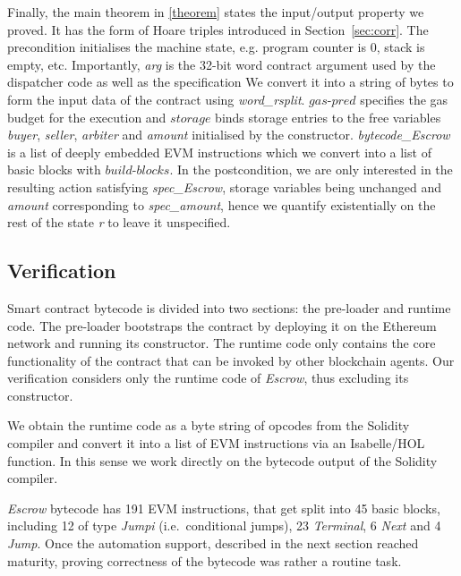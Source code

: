 \documentclass[sigplan,10pt]{acmart}\settopmatter{printfolios=true,printccs=false,printacmref=false}
\newcommand{\gaspred}{\mathit{gas\mbox{-}pred}}
\newcommand{\storage}{\mathit{storage}}
\newcommand{\bblocks}{\mathit{build\mbox{-}blocks}}
\begin{document}
Finally, the main theorem in \autoref{theorem} states the input/output 
property we proved.
It has the form of Hoare triples introduced in Section~\ref{sec:corr}.
The precondition initialises the machine state, e.g. program counter is $0$,
stack is empty, etc.
Importantly, \textit{arg} is the 32-bit word contract
argument used by the dispatcher code as well as the specification
We convert it into a string of bytes to form the input data of the contract
using \textit{word\_rsplit}.
$\gaspred$ specifies the gas budget for the execution and $\storage$
binds storage entries to the free variables \textit{buyer}, \textit{seller},
\textit{arbiter} and \textit{amount} initialised by the constructor.
\textit{bytecode\_Escrow} is a list of deeply embedded EVM
instructions which we convert into a list of basic blocks with $\bblocks$.
In the postcondition, we are only interested in the resulting action
satisfying \textit{spec\_Escrow}, storage variables being unchanged
and \textit{amount} corresponding to \textit{spec\_amount},
hence we quantify existentially on the rest of the state \textit{r}
to leave it unspecified.

\subsection{Verification}

\label{sec:verif}

Smart contract bytecode is divided into two sections: the pre-loader and
runtime code.
The pre-loader bootstraps the contract by deploying it on the
Ethereum network and running its constructor.
The runtime code only contains the core functionality of the contract
that can be invoked by other blockchain agents.
Our verification considers only the runtime code of \textit{Escrow},
thus excluding its constructor.

We obtain the runtime code as a byte string of opcodes from the Solidity
compiler and convert it into a list of EVM instructions via an
Isabelle/HOL function.
In this sense we work directly on the bytecode output of
the Solidity compiler.

\textit{Escrow} bytecode has 191 EVM instructions, that get split into 45 basic
blocks, including 12 of type \textit{Jumpi} (i.e.\ conditional jumps),
23 \textit{Terminal}, 6 \textit{Next} and 4 \textit{Jump}.
Once the automation support, described in the next section reached maturity,
proving correctness of the bytecode was rather a routine task. %
\end{document}
